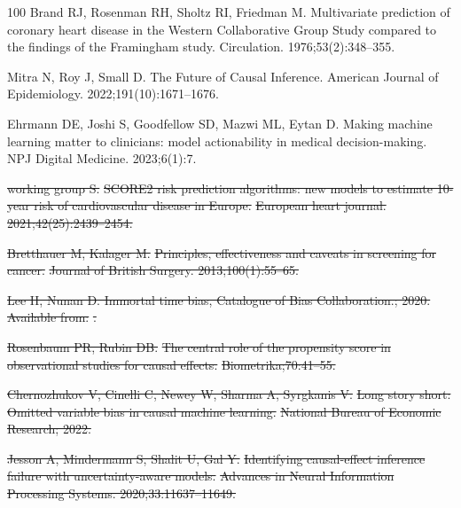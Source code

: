 \documentclass[10pt,letterpaper]{article}
\providecommand{\DIFdeltex}[1]{{\protect\color{red}\sout{#1}}}                      %
\providecommand{\DIFdelbegin}{} %
\providecommand{\DIFdel}[1]{\texorpdfstring{\DIFdeltex{#1}}{}} %
\newcommand{\DIFscaledelfig}{0.5}
\newlength{\DIFdelgraphicswidth} %
\newlength{\DIFdelgraphicsheight} %
\newcommand{\DIFdelincludegraphics}[2][]{%
\sbox{\DIFdelgraphicsbox}{\DIFOincludegraphics[#1]{#2}}%
\settoboxwidth{\DIFdelgraphicswidth}{\DIFdelgraphicsbox} %
\settoboxtotalheight{\DIFdelgraphicsheight}{\DIFdelgraphicsbox} %
\scalebox{\DIFscaledelfig}{%
\parbox[b]{\DIFdelgraphicswidth}{\usebox{\DIFdelgraphicsbox}\\[-\baselineskip] \rule{\DIFdelgraphicswidth}{0em}}\llap{\resizebox{\DIFdelgraphicswidth}{\DIFdelgraphicsheight}{%
\setlength{\unitlength}{\DIFdelgraphicswidth}%
\begin{picture}(1,1)%
\thicklines\linethickness{2pt} %
{\color[rgb]{1,0,0}\put(0,0){\framebox(1,1){}}}%
{\color[rgb]{1,0,0}\put(0,0){\line( 1,1){1}}}%
{\color[rgb]{1,0,0}\put(0,1){\line(1,-1){1}}}%
\end{picture}%
}\hspace*{3pt}}} %
} %
\DeclareRobustCommand{\DIFdelbegin}{\DIFOdelbegin \let\includegraphics\DIFdelincludegraphics} %
\begin{document}
\begin{thebibliography}{100}
  Brand RJ, Rosenman RH, Sholtz RI, Friedman M.
  \newblock Multivariate prediction of coronary heart disease in the Western Collaborative Group Study compared to the findings of the Framingham study.
  \newblock Circulation. 1976;53(2):348--355.

  Mitra N, Roy J, Small D.
  \newblock The Future of Causal Inference.
  \newblock American Journal of Epidemiology. 2022;191(10):1671--1676.

  Ehrmann DE, Joshi S, Goodfellow SD, Mazwi ML, Eytan D.
  \newblock Making machine learning matter to clinicians: model actionability in medical decision-making.
  \newblock NPJ Digital Medicine. 2023;6(1):7.
  \DIFdelbegin %

  \DIFdel{working group S.
  }%
  \DIFdel{SCORE2 risk prediction algorithms: new models to estimate 10-year risk of cardiovascular disease in Europe.
  }%
  \DIFdel{European heart journal. 2021;42(25):2439--2454.
  }%

  \DIFdel{Bretthauer M, Kalager M.
  }%
  \DIFdel{Principles, effectiveness and caveats in screening for cancer.
  }%
  \DIFdel{Journal of British Surgery. 2013;100(1):55--65.
  }%

  \DIFdel{Lee H, Nunan D. Immortal time bias, Catalogue of Bias Collaboration.; 2020.
  }%
  \DIFdel{Available from: }%
  \DIFdel{.
  }%

  \DIFdel{Rosenbaum PR, Rubin DB.
  }%
  \DIFdel{The central role of the propensity score in observational studies for causal effects.
  }%
  \DIFdel{Biometrika;70:41--55.
  }%

  \DIFdel{Chernozhukov V, Cinelli C, Newey W, Sharma A, Syrgkanis V.
  }%
  \DIFdel{Long story short: Omitted variable bias in causal machine learning.
  }%
  \DIFdel{National Bureau of Economic Research; 2022.
  }%

  \DIFdel{Jesson A, Mindermann S, Shalit U, Gal Y.
  }%
  \DIFdel{Identifying causal-effect inference failure with uncertainty-aware models.
  }%
  \DIFdel{Advances in Neural Information Processing Systems. 2020;33:11637--11649.
  }%


\end{thebibliography}
\end{document}

